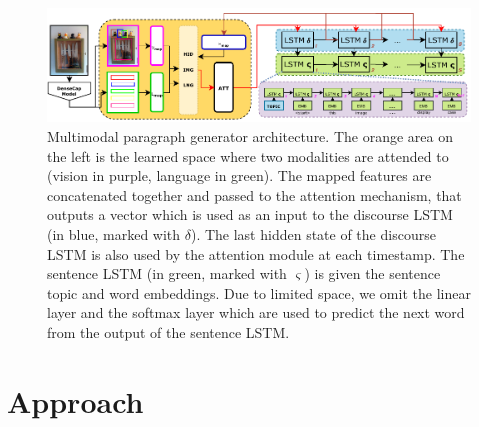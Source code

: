 \documentclass[11pt,a4paper]{article}
\begin{document}
\begin{figure}[h]
 \includegraphics[width=\linewidth]{figures/model}
 \caption{Multimodal paragraph generator architecture.
 		The orange area on the left is the learned space where two modalities are attended to (vision in purple, language in green).
		The mapped features are concatenated together and passed to the attention mechanism, that outputs a vector which is used as an input to the discourse LSTM (in blue, marked with $\delta$).
		The last hidden state of the discourse LSTM is also used by the attention module at each timestamp.
		The sentence LSTM (in green, marked with $\varsigma$) is given the sentence topic and word embeddings.
		Due to limited space, we omit the linear layer and the softmax layer which are used to predict the next word from the output of the sentence LSTM.}
 \label{fig:model}
\end{figure}


\section{Approach}
\end{document}
